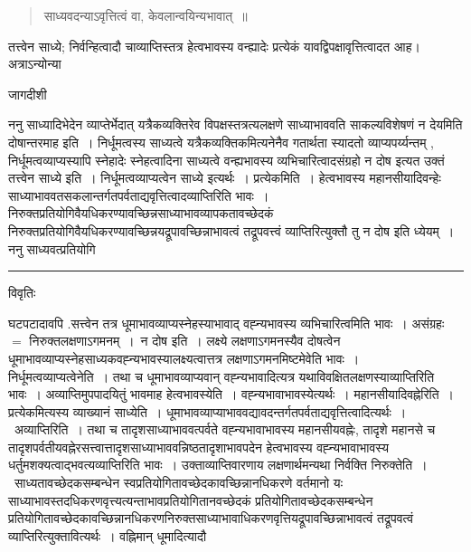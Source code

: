 \documentclass[10pt, openany]{book}
\begin{document}
{\newpage
\begin{quote}
\vpc
साध्यवदन्याऽवृत्तित्वं वा, केवलान्वयिन्यभावात्~॥
\end{quote}
{\la तत्त्वेन साध्ये; निर्वन्हित्वादौ चाव्याप्तिस्तत्र हेत्वभावस्य वन्ह्यादेः प्रत्येकं यावद्विपक्षावृत्तित्वादत आह। अत्राऽन्योन्या}
\begin{center} जागदीशी \end{center}
{\la ननु साध्यादिभेदेन व्याप्तेर्भेदात् यत्रैकव्यक्तिरेव
विपक्षस्तत्रत्यलक्षणे साध्याभाववति साकल्यविशेषणं न देयमिति दोषान्तरमाह इति~। निर्धूमत्वस्य साध्यत्वे यत्रैकव्यक्तिकमित्यनेनैव गतार्थता स्यादतो व्याप्यपर्य्यन्तम् , निर्धूमत्वव्याप्यस्यापि स्नेहादेः स्नेहत्वादिना साध्यत्वे वन्ह्यभावस्य व्यभिचारित्वादसंग्रहो न दोष इत्यत उक्तं तत्त्वेन साध्ये इति~। निर्धूमत्वव्याप्यत्वेन साध्ये इत्यर्थः~। प्रत्येकमिति~। हेत्वभावस्य महानसीयादिवन्हेः साध्याभाववतसकलान्तर्गतपर्वताद्यवृत्तित्वादव्याप्तिरिति भावः~। निरुक्तप्रतियोगिवैयधिकरण्यावच्छिन्नसाध्याभावव्यापकतावच्छेदकं निरुक्तप्रतियोगिवैयधिकरण्यावच्छिन्नयद्रूपावच्छिन्नाभावत्वं तद्रूपवत्त्वं व्याप्तिरित्युक्तौ तु न दोष इति ध्येयम्~। ननु साध्यवत्प्रतियोगि\textendash}\\
\hrule
\begin{center}     विवृतिः \end{center}
घटपटादावपि .सत्त्वेन तत्र धूमाभावव्याप्यस्नेहस्याभावाद् वह्न्यभावस्य व्यभिचारित्वमिति भावः~। असंग्रहः $=$ निरुक्तलक्षणाऽगमनम्~।~{\la न दोष इति~।} लक्ष्ये
लक्षणाऽगमनस्यैव दोषत्वेन धूमाभावव्याप्यस्नेहसाध्यकवह्न्यभावस्यालक्ष्यत्वात्तत्र लक्षणाऽगमनमिष्टमेवेति भावः~। निर्धूमत्वव्याप्यत्वेनेति~। तथा च धूमाभावव्याप्यवान् वह्न्यभावादित्यत्र यथाविवक्षितलक्षणस्याव्याप्तिरिति भावः~। अव्याप्तिमुपपादयितुं भावमाह हेत्वभावस्येति~। वह्न्यभावाभावस्येत्यर्थः~। {\la महानसीयादिवह्नेरिति~।} प्रत्येकमित्यस्य व्याख्यानं {\la साध्येति~।} धूमाभावव्याप्याभाववद्यावदन्तर्गतपर्वताद्यवृत्तित्वादित्यर्थः~।~{\la अव्याप्तिरिति~।} तथा च तादृशसाध्याभाववत्पर्वते वह्न्यभावाभावस्य महानसीयवह्नेः, तादृशे महानसे च तादृशपर्वतीयवह्नेरसत्त्वात्तादृशसाध्याभाववन्निष्ठतादृशाभावपदेन हेत्वभावस्य वह्न्यभावाभावस्य धर्तुमशक्यत्वाद्भवत्यव्याप्तिरिति भावः~। उक्ताव्याप्तिवारणाय लक्षणार्थमन्यथा निर्वक्ति {\la निरुक्तेति~।}~साध्यतावच्छेदकसम्बन्धेन स्वप्रतियोगितावच्छेदकावच्छिन्नानधिकरणे वर्तमानो यः साध्याभावस्तदधिकरणवृत्त्यत्यन्ताभावप्रतियोगितानवच्छेदकं प्रतियोगितावच्छेदकसम्बन्धेन प्रतियोगितावच्छेदकावच्छिन्नानधिकरणनिरुक्तसाध्याभावाधिकरणवृत्तियद्रूपावच्छिन्नाभावत्वं तद्रूपवत्वं व्याप्तिरित्युक्तावित्यर्थः~। वह्निमान् धूमादित्यादौ
}
\end{document}
